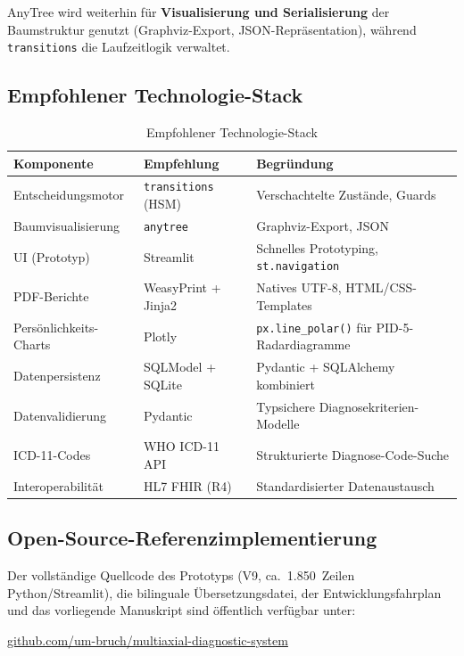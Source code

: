 \documentclass[11pt,a4paper]{article}
\begin{document}
AnyTree wird weiterhin f\"ur \textbf{Visualisierung und Serialisierung} der Baumstruktur genutzt (Graphviz-Export, JSON-Repr\"asentation), w\"ahrend \texttt{transitions} die Laufzeitlogik verwaltet.

\subsection{Empfohlener Technologie-Stack}

\begin{table}[H]
\centering
\caption{Empfohlener Technologie-Stack}
\label{tab:techstack}
\begin{tabularx}{\textwidth}{lXl}
\toprule
\textbf{Komponente} & \textbf{Empfehlung} & \textbf{Begr\"undung} \\
\midrule
Entscheidungsmotor & \texttt{transitions} (HSM) & Verschachtelte Zust\"ande, Guards \\
Baumvisualisierung & \texttt{anytree} & Graphviz-Export, JSON \\
UI (Prototyp) & Streamlit & Schnelles Prototyping, \texttt{st.navigation} \\
PDF-Berichte & WeasyPrint + Jinja2 & Natives UTF-8, HTML/CSS-Templates \\
Pers\"onlichkeits-Charts & Plotly & \texttt{px.line\_polar()} f\"ur PID-5-Radardiagramme \\
Datenpersistenz & SQLModel + SQLite & Pydantic + SQLAlchemy kombiniert \\
Datenvalidierung & Pydantic & Typsichere Diagnosekriterien-Modelle \\
ICD-11-Codes & WHO ICD-11 API & Strukturierte Diagnose-Code-Suche \\
Interoperabilit\"at & HL7 FHIR (R4) & Standardisierter Datenaustausch \\
\bottomrule
\end{tabularx}
\end{table}

\subsection{Open-Source-Referenzimplementierung}

Der vollst\"andige Quellcode des Prototyps (V9, ca.\ 1.850~Zeilen Python/Streamlit), die bilinguale \"Ubersetzungsdatei, der Entwicklungsfahrplan und das vorliegende Manuskript sind \"offentlich verf\"ugbar unter:

\begin{center}
\href{https://github.com/um-bruch/multiaxial-diagnostic-system}{github.com/um-bruch/multiaxial-diagnostic-system}
\end{center}
\end{document}
